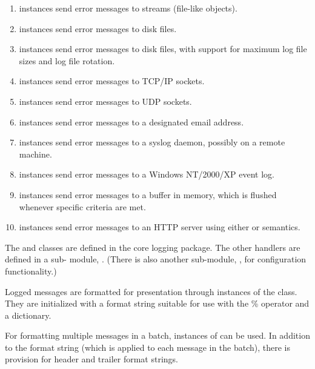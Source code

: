 \begin{enumerate}

\item {} instances send error messages to
streams (file-like objects).

\item {} instances send error messages to disk
files.

\item {} instances send error messages to disk
files, with support for maximum log file sizes and log file rotation.

\item {} instances send error messages to
TCP/IP sockets.

\item {} instances send error messages to UDP
sockets.

\item {} instances send error messages to a
designated email address.

\item {} instances send error messages to a
\UNIX{} syslog daemon, possibly on a remote machine.

\item {} instances send error messages to a
Windows NT/2000/XP event log.

\item {} instances send error messages to a
buffer in memory, which is flushed whenever specific criteria are
met.

\item {} instances send error messages to an
HTTP server using either  or  semantics.

\end{enumerate}

The  and  classes are defined
in the core logging package. The other handlers are defined in a sub-
module, . (There is also another sub-module,
, for configuration functionality.)

Logged messages are formatted for presentation through instances of the
 class. They are initialized with a format string
suitable for use with the \% operator and a dictionary.

For formatting multiple messages in a batch, instances of
 can be used. In addition to the format string
(which is applied to each message in the batch), there is provision for
header and trailer format strings.


